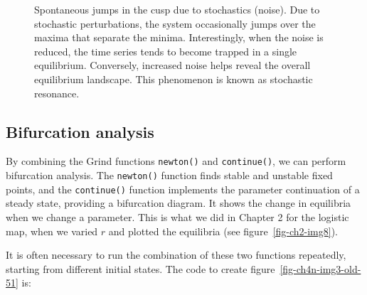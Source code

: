 \documentclass[
  a4paper,
  DIV=11,
  numbers=noendperiod,
  oneside]{scrreprt}
\begin{document}
\begin{figure}


\caption{\label{fig-ch4n-img2-old-50}Spontaneous jumps in the cusp due
to stochastics (noise). Due to stochastic perturbations, the system
occasionally jumps over the maxima that separate the minima.
Interestingly, when the noise is reduced, the time series tends to
become trapped in a single equilibrium. Conversely, increased noise
helps reveal the overall equilibrium landscape. This phenomenon is known
as stochastic resonance.}

\end{figure}%

\subsection{Bifurcation analysis}\label{sec-Bifurcation-analysis}

By combining the Grind functions \texttt{newton()} and
\texttt{continue()}, we can perform bifurcation analysis. The
\texttt{newton()} function finds stable and unstable fixed points, and
the \texttt{continue()} function implements the parameter continuation
of a steady state, providing a bifurcation diagram. It shows the change
in equilibria when we change a parameter. This is what we did in Chapter
2 for the logistic map, when we varied \(r\) and plotted the equilibria
(see figure~\ref{fig-ch2-img8}).

It is often necessary to run the combination of these two functions
repeatedly, starting from different initial states. The code to create
figure~\ref{fig-ch4n-img3-old-51} is:
\end{document}
